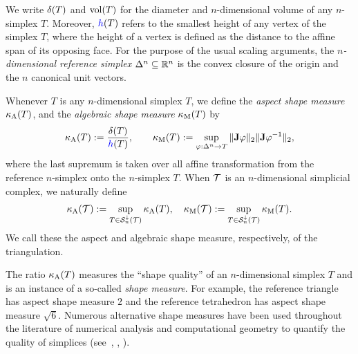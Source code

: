 \documentclass[10pt,a4paper]{article}
\begin{document}
We write ${\delta}(T)$ and $\operatorname{vol}(T)$ for the diameter and $n$-dimensional volume of any $n$-simplex $T$.
Moreover, $\height(T)$ refers to the smallest height of any vertex of the simplex $T$,
where the height of a vertex is defined as the distance to the affine span of its opposing face.
For the purpose of the usual scaling arguments, the \emph{$n$-dimensional reference simplex} $\Delta^n \subseteq {\mathbb R}^n$ is the convex closure of the origin and the $n$ canonical unit vectors. 



Whenever $T$ is any $n$-dimensional simplex $T$,
we define the \emph{aspect shape measure} $\kappa_{\rm A}(T)$,
and 
the \emph{algebraic shape measure} $\kappa_{\rm M}(T)$
by 
\begin{align}\label{math:shapemeasure}
    \aspectratio(T)
    := 
    \frac{ \diam(T) }{ \height(T) }
    ,
    \qquad 
    \algebraicshapemeasure(T)
    := 
    \sup_{ \varphi : \Delta^n \rightarrow T } 
    \matnorm{\Jacobian \varphi} \matnorm{ \Jacobian \varphi^{-1} }
    ,
\end{align}
where the last supremum is taken over all affine transformation from the reference $n$-simplex onto the $n$-simplex $T$. 
When ${\mathcal T}$ is an $n$-dimensional simplicial complex, we naturally define 
\begin{align}\label{math:shapemeasure:triangulation}
    \kappa_{\rm A}({\mathcal T}) := \sup_{ T \in {\mathcal S}^{\downarrow}_{n}({\mathcal T}) } \kappa_{\rm A}(T)
    ,
    \quad 
    \kappa_{\rm M}({\mathcal T}) := \sup_{ T \in {\mathcal S}^{\downarrow}_{n}({\mathcal T}) } \kappa_{\rm M}(T)
    .
\end{align}
We call these the aspect and algebraic shape measure, respectively, of the triangulation. 

\begin{remark}
    The ratio $\kappa_{\rm A}(T)$ measures the ``shape quality'' of an $n$-dimensional simplex $T$ and is an instance of a so-called \emph{shape measure}.
    For example, the reference triangle has aspect shape measure $2$ and the reference tetrahedron has aspect shape measure $\sqrt{6}$. 
    Numerous alternative shape measures have been used throughout the literature of numerical analysis and computational geometry to quantify the quality of simplices (see~\cite[p.61, Definition 5.1]{braess2001finite}, 
    \cite[p.97, Definition 4.2.16 ]{brenner2008mathematical}, %
    \cite[Definition~11.2]{ern2021finite}). 
\end{remark}
\end{document}
